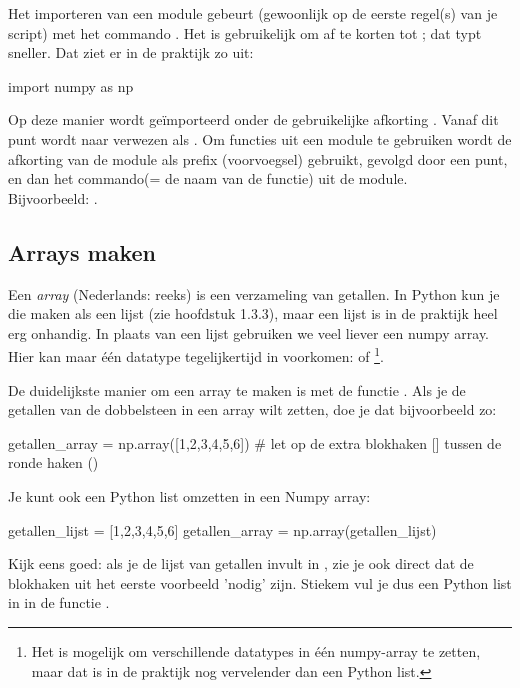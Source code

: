 \documentclass[a4paper,11pt, fleqn]{article}
\begin{document}
Het importeren van een module gebeurt (gewoonlijk op de eerste regel(s) van je script) met het commando . Het is gebruikelijk om  af te korten tot ; dat typt sneller. Dat ziet er in de praktijk zo uit: 
\begin{python}
import numpy as np
\end{python}
Op deze manier wordt  ge\"importeerd onder de gebruikelijke afkorting . Vanaf dit punt wordt naar  verwezen als . Om functies uit een module te gebruiken wordt de afkorting van de module als prefix (voorvoegsel) gebruikt, gevolgd door een punt, en dan het commando(= de naam van de functie) uit de module. \\
Bijvoorbeeld: .

\subsection{Arrays maken}
Een {\it array} (Nederlands: reeks) is een verzameling van getallen. In Python kun je die maken als een lijst (zie hoofdstuk 1.3.3), maar een lijst is in de praktijk heel erg onhandig. In plaats van een lijst gebruiken we veel liever een numpy array. Hier kan maar \'e\'en datatype tegelijkertijd in voorkomen:  of \footnote{Het is mogelijk om verschillende datatypes in \'e\'en numpy-array te zetten, maar dat is in de praktijk nog vervelender dan een Python list.}.

De duidelijkste manier om een array te maken is met de functie . Als je de getallen van de dobbelsteen in een array wilt zetten, doe je dat bijvoorbeeld zo:
\begin{python}
getallen_array = np.array([1,2,3,4,5,6]) 
# let op de extra blokhaken [] tussen de ronde haken ()
\end{python}

Je kunt ook een Python list omzetten in een Numpy array:
\begin{python}
getallen_lijst = [1,2,3,4,5,6]
getallen_array = np.array(getallen_lijst) 
\end{python}
Kijk eens goed: als je de lijst van getallen invult in , zie je ook direct dat de blokhaken uit het eerste voorbeeld 'nodig' zijn. Stiekem vul je dus een Python list in in de functie .
\end{document}
